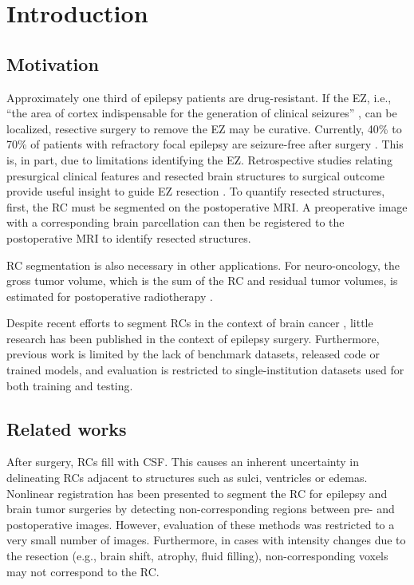 \section{Introduction}

\subsection{Motivation}

Approximately one third of epilepsy patients are drug-resistant.
If the \ac{EZ}, i.e., ``the area of cortex indispensable for the generation of clinical seizures'' \cite{rosenow_presurgical_2001}, can be localized, resective surgery to remove the \ac{EZ} may be curative.
Currently, 40\% to 70\% of patients with refractory focal epilepsy are seizure-free after surgery \cite{jobst_resective_2015}.
This is, in part, due to limitations identifying the \ac{EZ}.
Retrospective studies relating presurgical clinical features and resected brain structures to surgical outcome provide useful insight to guide \ac{EZ} resection \cite{jobst_resective_2015}.
To quantify resected structures, first, the \ac{RC} must be segmented on the postoperative \ac{MRI}.
A preoperative image with a corresponding brain parcellation can then be registered to the postoperative \ac{MRI} to identify resected structures.

\Ac{RC} segmentation is also necessary in other applications.
For neuro-oncology, the gross tumor volume, which is the sum of the \ac{RC} and residual tumor volumes, is estimated for postoperative radiotherapy \cite{ermis_fully_2020}.

Despite recent efforts to segment \acp{RC} in the context of brain cancer \cite{meier_automatic_2017,ermis_fully_2020}, little research has been published in the context of epilepsy surgery.
Furthermore, previous work is limited by the lack of benchmark datasets, released code or trained models, and evaluation is restricted to single-institution datasets used for both training and testing.


\subsection{Related works}

After surgery, \acp{RC} fill with \ac{CSF}.
This causes an inherent uncertainty in delineating \acp{RC} adjacent to structures such as sulci, ventricles or edemas.
Nonlinear registration has been presented to segment the \ac{RC} for epilepsy \cite{chitphakdithai_non-rigid_2010} and brain tumor \cite{chen_deformable_2015} surgeries by detecting non-corresponding regions between pre- and postoperative images.
However, evaluation of these methods was restricted to a very small number of images.
Furthermore, in cases with intensity changes due to the resection (e.g., brain shift, atrophy, fluid filling), non-corresponding voxels may not correspond to the \ac{RC}.

